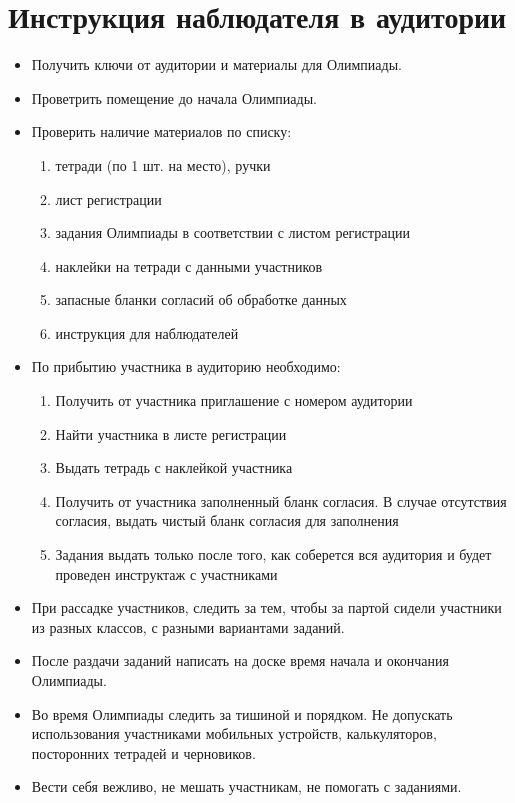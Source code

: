 \documentclass[a4paper,12pt]{article}
\begin{document}
\section{Инструкция наблюдателя в аудитории}

\begin{itemize} %
	\item Получить ключи от аудитории и материалы для Олимпиады.
	\item Проветрить помещение до начала Олимпиады.
	\item Проверить наличие материалов по списку: \begin{enumerate}
		\item тетради (по 1 шт. на место), ручки
		\item лист регистрации
		\item задания Олимпиады в соответствии с листом регистрации
		\item наклейки на тетради с данными участников
		\item запасные бланки согласий об обработке данных
		\item инструкция для наблюдателей
	\end{enumerate}
	\item По прибытию участника в аудиторию необходимо: \begin{enumerate}
		\item Получить от участника приглашение с номером аудитории
		\item Найти участника в листе регистрации
		\item Выдать тетрадь с наклейкой участника
		\item Получить от участника заполненный бланк согласия. В случае отсутствия согласия, выдать чистый бланк согласия для заполнения
		\item Задания выдать только после того, как соберется вся аудитория и будет проведен инструктаж с участниками
	\end{enumerate}
	\item При рассадке участников, следить за тем, чтобы за партой сидели участники из разных классов, с разными вариантами заданий.
	\item После раздачи заданий написать на доске время начала и окончания Олимпиады.
	\item Во время Олимпиады следить за тишиной и порядком. Не допускать использования участниками мобильных устройств, калькуляторов, посторонних тетрадей и черновиков.
	\item Вести себя вежливо, не мешать участникам, не помогать с заданиями.

\end{itemize}
\end{document}
